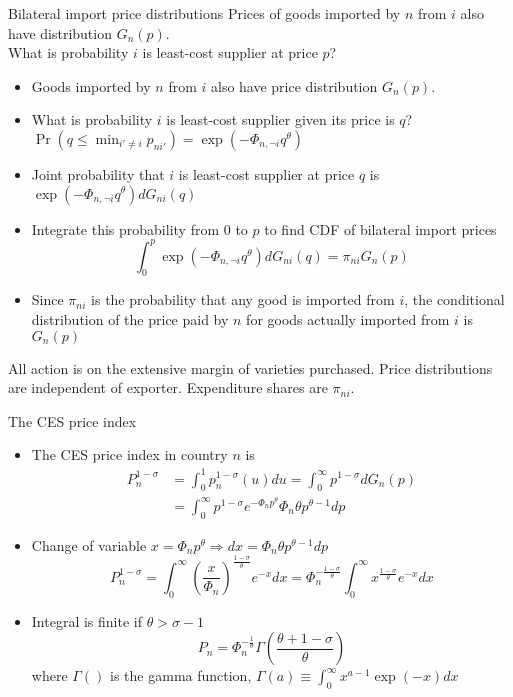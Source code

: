\documentclass[10pt,notes=hide]{beamer}
\begin{document}
\begin{frame}{Bilateral import price distributions}
Prices of goods imported by $n$ from $i$ also have distribution $G_n(p)$.\\
What is probability $i$ is least-cost supplier at price $p$?
\begin{itemize}
	\item Goods imported by $n$ from $i$ also have price distribution $G_n(p)$.
	\item What is probability $i$ is least-cost supplier given its price is $q$? 
	$\Pr\left(q \leq \min_{i'\neq i} p_{ni'}\right) = \exp\left(-\Phi_{n,\neg i}q^{\theta}\right)$
	\item Joint probability that $i$ is least-cost supplier at price $q$ is
	$\exp\left(-\Phi_{n,\neg i}q^{\theta}\right)d G_{ni}(q)$
	\item Integrate this probability from $0$ to $p$ to find CDF of bilateral import prices
	\begin{equation*}
	\int_{0}^{p} \exp\left(-\Phi_{n,\neg i}q^{\theta}\right)d G_{ni}(q)
	= \pi_{ni} G_n(p)
	\end{equation*}
	\item Since $\pi_{ni}$ is the probability that any good is imported from $i$, the conditional distribution of the price paid by $n$ for goods actually imported from $i$ is $G_n(p)$
\end{itemize}
All action is on the extensive margin of varieties purchased. Price distributions are independent of exporter. Expenditure shares are $\pi_{ni}$.
\end{frame}
\begin{frame}{The CES price index}
\begin{itemize}
\item The CES price index in country $n$ is 
\begin{align*}
P_{n}^{1-\sigma } 
&=\int_{0}^{1}p_{n}^{1-\sigma }(u) du 
=\int_{0}^{\infty }p^{1-\sigma }dG_{n}\left( p\right) \\
&=\int_{0}^{\infty }p^{1-\sigma }e^{-\Phi _{n}p^{\theta }}\Phi _{n}\theta
p^{\theta -1}dp
\end{align*}
\item Change of variable $x=\Phi _{n}p^{\theta }\Rightarrow
dx=\Phi _{n}\theta p^{\theta -1}dp$
\begin{equation*}
P_{n}^{1-\sigma }
=\int_{0}^{\infty }\left( \frac{x}{\Phi _{n}}\right) ^{\frac{1-\sigma }{\theta }}e^{-x}dx
=\Phi _{n}^{-\frac{1-\sigma }{\theta }}\int_{0}^{\infty }x^{\frac{1-\sigma 
}{\theta }}e^{-x}dx
\end{equation*}
\item Integral is finite if $\theta>\sigma-1$
\begin{equation*}
P_{n} = \Phi _{n}^{-\frac{1}{\theta }} \Gamma \left( \frac{\theta +1-\sigma }{\theta }\right)
\end{equation*}
where $\Gamma()$ is the gamma function, $\Gamma(a)\equiv \int_{0}^{\infty} x^{a-1} \exp(-x)dx$
\end{itemize}
\end{frame}
\end{document}
